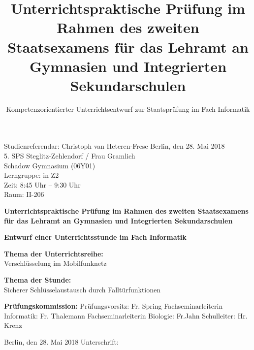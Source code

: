

\usepackage{xcolor}
\usepackage{colortbl}
\usepackage{rotating}
\usepackage[final]{pdfpages}
\titlehead{. SPS Steglitz-Zehlendorf, Fr. Grammlich \hfill Berlin, 28. Mai 2018}
\title{Unterrichtspraktische Prüfung im Rahmen des zweiten Staatsexamens für das Lehramt an Gymnasien und Integrierten Sekundarschulen}
\subtitle{Kompetenzorientierter Unterrichtsentwurf zur Staatsprüfung im Fach Informatik}
%

%
\onehalfspace
\noindent
Studienreferendar: Christoph van Heteren-Frese \hfill Berlin, den 28. Mai 2018 \\
5. SPS Steglitz-Zehlendorf / Frau Gramlich \\
Schadow Gymnasium (06Y01)\\
Lerngruppe: in-Z2\\
Zeit: 8:45 Uhr -- 9:30 Uhr\\
Raum: II-206 \\
\onehalfspace
\begin{center}
\LARGE{\textsf{\textbf{Unterrichtspraktische Prüfung im Rahmen des zweiten Staatsexamens für das Lehramt an Gymnasien und Integrierten Sekundarschulen}}}
\par\vspace*{1cm}
\Large{\textsf{\textbf{Entwurf einer Unterrichtsstunde im Fach Informatik}}}
\par\vspace*{1cm}
\large{\textsf{\textbf{Thema der Unterrichtsreihe:}\\ Verschlüsselung im Mobilfunknetz}}
\par\vspace*{1cm}
\large{\textsf{\textbf{Thema der Stunde:}\\ Sicherer Schlüsselaustausch durch Falltürfunktionen}}
\end{center}
\begin{flushleft}
\onehalfspacing
\vspace*{3em} 
\par
\textbf{Prüfungskommission:} \newline
Prüfungsvorsitz: Fr. Spring\newline
Fachseminarleiterin Informatik: Fr. Thalemann\newline
Fachseminarleiterin Biologie: Fr.Jahn \newline
Schulleiter: Hr. Krenz 
\par\vspace*{2cm}
Berlin, den 28. Mai 2018 \hspace{.5cm} Unterschrift:\underline{\hspace{6cm}}\\ 
\end{flushleft}
%
\newpage
{}
\setcounter{page}{1}

